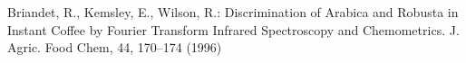 \documentclass[conference]{IEEEtran}
\begin{document}
\begin{thebibliography}{5}
Briandet, R., Kemsley, E., Wilson, R.:
Discrimination of Arabica and Robusta in Instant Coffee by Fourier Transform Infrared Spectroscopy
and Chemometrics.
J. Agric. Food Chem, 44, 170--174 (1996)







\end{thebibliography}


\end{document}

